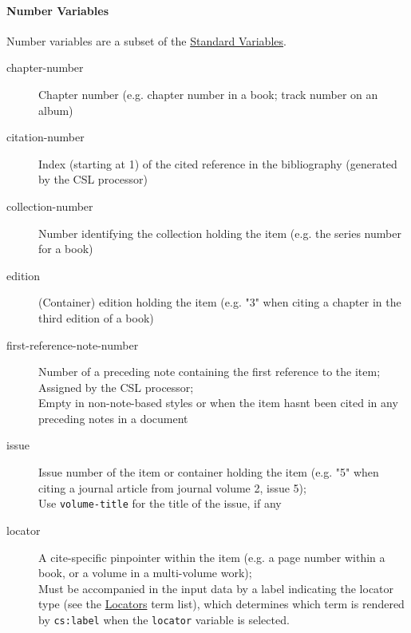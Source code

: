 \hypertarget{number-variables}{%
\paragraph{Number Variables}\label{number-variables}}

Number variables are a subset of the
\protect\hyperlink{standard-variables}{Standard Variables}.

\begin{description}

  \item[chapter-number]
    Chapter number (e.g. chapter number in a book; track number on an album)

  \item[citation-number]
    Index (starting at 1) of the cited reference in the bibliography
    (generated by the CSL processor)

  \item[collection-number]
    Number identifying the collection holding the item (e.g. the series
    number for a book)

  \item[edition]
    (Container) edition holding the item (e.g. "3" when citing a chapter in
    the third edition of a book)

  \item[first-reference-note-number]
    Number of a preceding note containing the first reference to the item;\\
    Assigned by the CSL processor;\\
    Empty in non-note-based styles or when the item hasn\textquotesingle t
    been cited in any preceding notes in a document

  \item[issue]
    Issue number of the item or container holding the item (e.g. "5" when
    citing a journal article from journal volume 2, issue 5);\\
    Use \texttt{volume-title} for the title of the issue, if any

  \item[locator]
    A cite-specific pinpointer within the item (e.g. a page number within a
    book, or a volume in a multi-volume work);\\
    Must be accompanied in the input data by a label indicating the locator
    type (see the \protect\hyperlink{locators}{Locators} term list), which
    determines which term is rendered by \texttt{cs:label} when the
    \texttt{locator} variable is selected.


\end{description}
